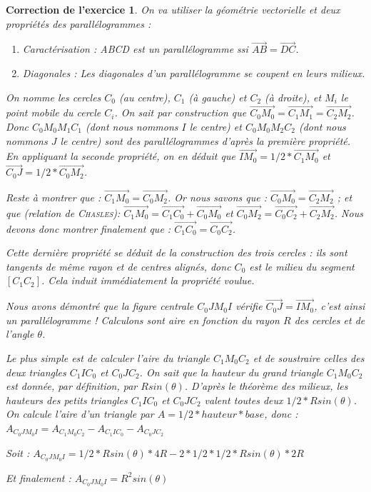 \documentclass[12pt]{article}
\theoremstyle{break}
\newtheorem{cor}{Correction de l'exercice}
\begin{document}
\begin{cor}
On va utiliser la géométrie vectorielle et deux propriétés des parallélogrammes :\begin{enumerate}
\item \textit{Caractérisation} : ABCD est un parallélogramme ssi $\overrightarrow{AB} = \overrightarrow{DC}$.
\item \textit{Diagonales} : Les diagonales d'un parallélogramme se coupent en leurs milieux.
\end{enumerate}

On nomme les cercles $C_0$ (au centre), $C_1$ (à gauche) et $C_2$ (à droite), et $M_i$ le point mobile du cercle $C_i$. On sait par construction que $\overrightarrow{C_0 M_0} = \overrightarrow{C_1 M_1} = \overrightarrow{C_2 M_2}$. Donc $C_0 M_0 M_1 C_1$ (dont nous nommons $I$ le centre) et $C_0 M_0 M_2 C_2$ (dont nous nommons $J$ le centre) sont des parallélogrammes d'après la première propriété. En appliquant la seconde propriété, on en déduit que $\overrightarrow{I M_0} = 1/2 * \overrightarrow{C_1 M_0}$ et $\overrightarrow{C_0 J} = 1/2 * \overrightarrow{C_0 M_2}$.

Reste à montrer que : $\overrightarrow{C_1 M_0} = \overrightarrow{C_0 M_2}$. Or nous savons que : $\overrightarrow{C_0 M_0} = \overrightarrow{C_2 M_2}$ ; et que (relation de \textsc{Chasles}): $\overrightarrow{C_1 M_0} = \overrightarrow{C_1 C_0} + \overrightarrow{C_0 M_0}$ et $\overrightarrow{C_0 M_2} = \overrightarrow{C_0 C_2} + \overrightarrow{C_2 M_2}$. Nous devons donc montrer finalement que : $\overrightarrow{C_1 C_0} = \overrightarrow{C_0 C_2}$.

Cette dernière propriété se déduit de la construction des trois cercles : ils sont tangents de même rayon et de centres alignés, donc $C_0$ est le milieu du segment $[C_1 C_2]$. Cela induit immédiatement la propriété voulue.

Nous avons démontré que la figure centrale $C_0 J M_0 I$ vérifie $\overrightarrow{C_0 J} = \overrightarrow{I M_0}$, c'est ainsi un parallélogramme ! Calculons sont aire en fonction du rayon $R$ des cercles et de l'angle $\theta$.

Le plus simple est de calculer l'aire du triangle $C_1 M_0 C_2$ et de soustraire celles des deux triangles $C_1 I C_0$ et $C_0 J C_2$. On sait que la hauteur du grand triangle $C_1 M_0 C_2$ est donnée, par définition, par $R sin(\theta)$. D'après le théorème des milieux, les hauteurs des petits triangles $C_1 I C_0$ et $C_0 J C_2$ valent toutes deux $1/2 * R sin(\theta)$. On calcule l'aire d'un triangle par $A = 1/2 * hauteur * base$, donc :
$A_{C_0 J M_0 I} = A_{C_1 M_0 C_2} - A_{C_1 I C_0} - A_{C_0 J C_2}$

Soit : $A_{C_0 J M_0 I} = 1/2 * R sin(\theta) * 4R - 2 * 1/2 * 1/2 * R sin(\theta) * 2R$

Et finalement : $A_{C_0 J M_0 I} = R^2 sin(\theta)$
\end{cor}
\end{document}
